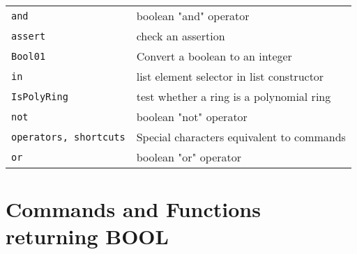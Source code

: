 \documentclass[a4paper]{mybook}
\begin{document}
\begin{center}
\begin{longtable}{ll}
   
{\verb~and~} &
      boolean "and" operator\\
   
{\verb~assert~} &
      check an assertion\\
   
{\verb~Bool01~} &
      Convert a boolean to an integer\\
   
{\verb~in~} &
      list element selector in list constructor\\
   
{\verb~IsPolyRing~} &
      test whether a ring is a polynomial ring\\
   
{\verb~not~} &
      boolean "not" operator\\
   
{\verb~operators, shortcuts~} &
      Special characters equivalent to commands\\
   
{\verb~or~} &
      boolean "or" operator\\
   
\end{longtable}
\end{center}

\noindent



\section{Commands and Functions returning BOOL}
\label{Commands and Functions returning BOOL}

        
\end{document}
